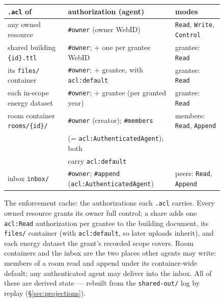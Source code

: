 \documentclass[11pt,a4paper]{article}
\theoremstyle{remark}
\newcommand{\code}[1]{\texttt{#1}}
\begin{document}
\begin{figure}[t]
\centering
\small
\setlength{\tabcolsep}{4pt}
\begin{tabular}{@{}lll@{}}
\code{.acl} of & authorization (agent) & modes \\
\hline
any owned resource & \code{\#owner} (owner WebID) & \code{Read},
  \code{Write}, \code{Control} \\[3pt]
shared building \code{\{id\}.ttl} & \code{\#owner}; + one per grantee WebID
  & grantee: \code{Read} \\
its \code{files/} container & \code{\#owner}; + grantee, with
  \code{acl:default} & grantee: \code{Read} \\
each in-scope energy dataset & \code{\#owner}; + grantee (per granted year)
  & grantee: \code{Read} \\[3pt]
room container \code{rooms/\{id\}/} & \code{\#owner} (creator);
  \code{\#members} & members: \code{Read}, \code{Append} \\
 & \quad(= \code{acl:AuthenticatedAgent}); both & \\
 & \quad carry \code{acl:default} & \\
inbox \code{inbox/} & \code{\#owner}; \code{\#append}
  (\code{acl:AuthenticatedAgent}) & peers: \code{Read}, \code{Append} \\
\end{tabular}
\caption{The enforcement cache: the authorizations each \code{.acl} carries.
Every owned resource grants its owner full control; a share adds one
\code{acl:Read} authorization per grantee to the building document, its
\code{files/} container (with \code{acl:default}, so later uploads inherit),
and each energy dataset the grant's recorded scope covers. Room containers
and the inbox are the two places other agents may write: members of a room
read and append under its container-wide default; any authenticated agent
may deliver into the inbox. All of these are derived state --- rebuilt from
the \code{shared-out/} log by replay (\S\ref{sec:projections}).}
\label{fig:acls}
\end{figure}
\end{document}
